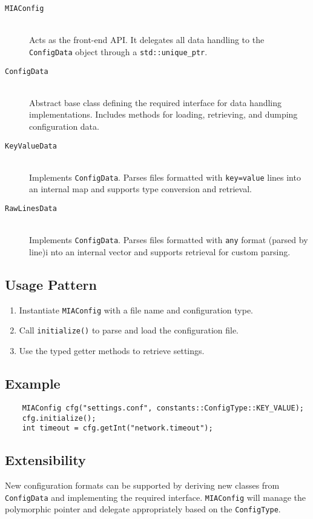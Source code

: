 \begin{description}
	\item[\texttt{MIAConfig}] 
	\hfill \\
	Acts as the front-end API. It delegates all data handling to the \texttt{ConfigData} object through a \texttt{std::unique\_ptr}.
	
	\item[\texttt{ConfigData}] 
	\hfill \\
	Abstract base class defining the required interface for data handling implementations. Includes methods for loading, retrieving, and dumping configuration data.
	
	\item[\texttt{KeyValueData}]
	\hfill \\
	Implements \texttt{ConfigData}. Parses files formatted with \texttt{key=value} lines into an internal map and supports type conversion and retrieval.
	
	\item[\texttt{RawLinesData}]
	\hfill \\
	Implements \texttt{ConfigData}. Parses files formatted with \texttt{any} format (parsed by line)i nto an internal vector and supports retrieval for custom parsing.
\end{description}

\subsection{Usage Pattern}

\begin{enumerate}
	\item Instantiate \texttt{MIAConfig} with a file name and configuration type.
	\item Call \texttt{initialize()} to parse and load the configuration file.
	\item Use the typed getter methods to retrieve settings.
\end{enumerate}

\subsection{Example}

\begin{verbatim}
	MIAConfig cfg("settings.conf", constants::ConfigType::KEY_VALUE);
	cfg.initialize();
	int timeout = cfg.getInt("network.timeout");
\end{verbatim}

\subsection{Extensibility}

New configuration formats can be supported by deriving new classes from \texttt{ConfigData} and implementing the required interface. \texttt{MIAConfig} will manage the polymorphic pointer and delegate appropriately based on the \texttt{ConfigType}.








